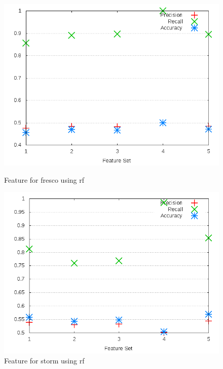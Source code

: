 \begin{figure}[h]
    \centering

    \begin{minipage}[b]{0.45\linewidth}
        \includegraphics[width=1.0\textwidth]{images/rf/test_3/fresco_sample_range}
        \caption{Feature for fresco using \gls{rf}}
        \label{fig:test_3_fresco_rf}
    \end{minipage}
\quad
    \begin{minipage}[b]{0.45\linewidth}
        \includegraphics[width=1.0\textwidth]{images/rf/test_3/storm_sample_range}
        \caption{Feature for storm using \gls{rf}}
        \label{fig:test_3_storm_rf}
    \end{minipage}
\end{figure}

